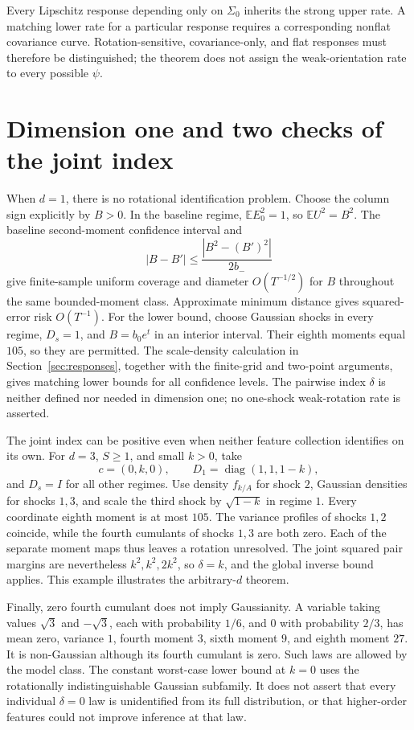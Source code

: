 \documentclass[11pt,a4paper]{article}
\numberwithin{equation}{section}
\newcommand{\E}{\mathbb E}
\DeclareMathOperator{\diag}{diag}
\begin{document}
Every Lipschitz response depending only on \(\Sigma_0\) inherits the
strong upper rate. A matching lower rate for a particular response
requires a corresponding nonflat covariance curve.
Rotation-sensitive, covariance-only, and flat responses must therefore
be distinguished; the theorem does not assign the weak-orientation rate
to every possible \(\psi\).

\section{Dimension one and two checks of the joint index}\label{sec:checks}
When \(d=1\), there is no rotational identification problem.
Choose the column sign explicitly by \(B>0\).
In the baseline regime, \(\E E_0^2=1\), so \(\E U^2=B^2\).
The baseline second-moment confidence interval and
\[
 |B-B'|\le\frac{|B^2-(B')^2|}{2b_-}
\]
give finite-sample uniform coverage and diameter \(O(T^{-1/2})\)
for \(B\) throughout the same bounded-moment class.
Approximate minimum distance gives squared-error risk \(O(T^{-1})\).
For the lower bound, choose Gaussian shocks in every regime, \(D_s=1\),
and \(B=b_0e^t\) in an interior interval.
Their eighth moments equal \(105\), so they are permitted.
The scale-density calculation in Section~\ref{sec:responses}, together
with the finite-grid and two-point arguments, gives matching lower
bounds for all confidence levels.
The pairwise index \(\delta\) is neither defined nor needed in dimension
one; no one-shock weak-rotation rate is asserted.

The joint index can be positive even when neither feature collection
identifies on its own. For \(d=3\), \(S\ge1\), and small \(k>0\), take
\[
 c=(0,k,0),\qquad D_1=\diag(1,1,1-k),
\]
and \(D_s=I\) for all other regimes.
Use density \(f_{k/A}\) for shock \(2\), Gaussian densities for shocks
\(1,3\), and scale the third shock by \(\sqrt{1-k}\) in regime \(1\).
Every coordinate eighth moment is at most \(105\).
The variance profiles of shocks \(1,2\) coincide, while the fourth
cumulants of shocks \(1,3\) are both zero.
Each of the separate moment maps thus leaves a rotation unresolved.
The joint squared pair margins are nevertheless \(k^2,k^2,2k^2\), so
\(\delta=k\), and the global inverse bound applies.
This example illustrates the arbitrary-\(d\) theorem.

Finally, zero fourth cumulant does not imply Gaussianity.
A variable taking values \(\sqrt3\) and \(-\sqrt3\), each with
probability \(1/6\), and \(0\) with probability \(2/3\), has mean zero,
variance \(1\), fourth moment \(3\), sixth moment \(9\), and eighth
moment \(27\). It is non-Gaussian although its fourth cumulant is zero.
Such laws are allowed by the model class.
The constant worst-case lower bound at \(k=0\) uses the rotationally
indistinguishable Gaussian subfamily. It does not assert that every
individual \(\delta=0\) law is unidentified from its full distribution,
or that higher-order features could not improve inference at that law.
\end{document}
